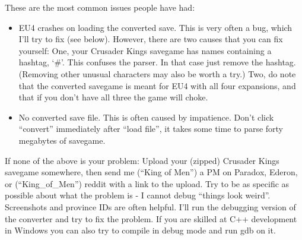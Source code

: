 \documentclass[12pt,ebook,oneside]{book}
\begin{document}
These are the most common issues people have had:
\begin{itemize}
\item EU4 crashes on loading the converted save. This is very often a
  bug, which I'll try to fix (see below). However, there are two
  causes that you can fix yourself: One, your Crusader Kings savegame
  has names containing a hashtag, `\#'. This confuses the
  parser. In that case just remove the hashtag. (Removing other
  unusual characters may also be worth a try.) Two, do note that the
  converted savegame is meant for EU4 with all four expansions, and
  that if you don't have all three the game will choke.
\item No converted save file. This is often caused by
  impatience. Don't click ``convert'' immediately after ``load file'',
  it takes some time to parse forty megabytes of savegame.
\end{itemize}

If none of the above is your problem: Upload your (zipped) Crusader Kings
savegame somewhere, then send me (``King of Men'') a PM on Paradox,
Ederon, or (``King\_of\_Men'') reddit with a link to the upload. Try to be as
specific as possible about what the problem is - I cannot debug
``things look weird''. Screenshots and province IDs are often
helpful. I'll run the
debugging version of the converter and try to fix the
problem. If you are skilled at C++ development in Windows you can also
try to compile in debug mode and run gdb on it. 
\end{document}
